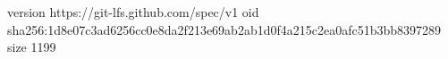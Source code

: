 version https://git-lfs.github.com/spec/v1
oid sha256:1d8e07c3ad6256cc0e8da2f213e69ab2ab1d0f4a215c2ea0afc51b3bb8397289
size 1199
